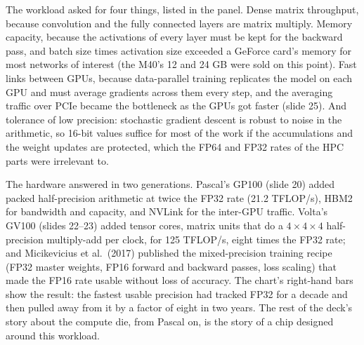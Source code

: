 \documentclass[11pt,letterpaper]{article}
\begin{document}
The workload asked for four things, listed in the panel. Dense matrix throughput, because convolution and the fully connected layers are matrix multiply. Memory capacity, because the activations of every layer must be kept for the backward pass, and batch size times activation size exceeded a GeForce card's memory for most networks of interest (the M40's 12 and 24 GB were sold on this point). Fast links between GPUs, because data-parallel training replicates the model on each GPU and must average gradients across them every step, and the averaging traffic over PCIe became the bottleneck as the GPUs got faster (slide 25). And tolerance of low precision: stochastic gradient descent is robust to noise in the arithmetic, so 16-bit values suffice for most of the work if the accumulations and the weight updates are protected, which the FP64 and FP32 rates of the HPC parts were irrelevant to.

The hardware answered in two generations. Pascal's GP100 (slide 20) added packed half-precision arithmetic at twice the FP32 rate (21.2 TFLOP/s), HBM2 for bandwidth and capacity, and NVLink for the inter-GPU traffic. Volta's GV100 (slides 22--23) added tensor cores, matrix units that do a $4\times4\times4$ half-precision multiply-add per clock, for 125 TFLOP/s, eight times the FP32 rate; and Micikevicius et al.\ (2017) published the mixed-precision training recipe (FP32 master weights, FP16 forward and backward passes, loss scaling) that made the FP16 rate usable without loss of accuracy. The chart's right-hand bars show the result: the fastest usable precision had tracked FP32 for a decade and then pulled away from it by a factor of eight in two years. The rest of the deck's story about the compute die, from Pascal on, is the story of a chip designed around this workload.
\end{document}
